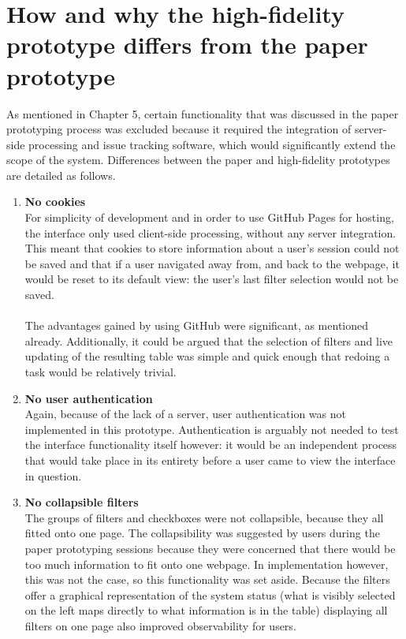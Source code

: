 \section{How and why the high-fidelity prototype differs from the paper prototype}
As mentioned in Chapter 5, certain functionality that was discussed in the paper prototyping process was excluded because it required the integration of server-side processing and issue tracking software, which would significantly extend the scope of the system. Differences between the paper and high-fidelity prototypes are detailed as follows. 
\begin{enumerate}
 \item \textbf{No cookies}\\
For simplicity of development and in order to use GitHub Pages for hosting, the interface only used client-side processing, without any server integration. This meant that cookies to store information about a user's session could not be saved and that if a user navigated away from, and back to the webpage, it would be reset to its default view: the user's last filter selection would not be saved. \\
\\
The advantages gained by using GitHub were significant, as mentioned already. Additionally, it could be argued that the selection of filters and live updating of the resulting table was simple and quick enough that redoing a task would be relatively trivial. 

\item \textbf{No user authentication}\\
Again, because of the lack of a server, user authentication was not implemented in this prototype. Authentication is arguably not needed to test the interface functionality itself however: it would be an independent process that would take place in its entirety before a user came to view the interface in question. 

\item \textbf{No collapsible filters}\\
The groups of filters and checkboxes were not collapsible, because they all fitted onto one page. The collapsibility was suggested by users during the paper prototyping sessions because they were concerned that there would be too much information to fit onto one webpage. In implementation however, this was not the case, so this functionality was set aside. Because the filters offer a graphical representation of the system status (what is visibly selected on the left maps directly to what information is in the table) displaying all filters on one page also improved observability \citep[p. 270]{DixFinlay} for users.


\end{enumerate}
